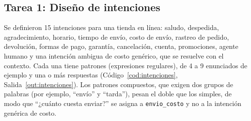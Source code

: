 \documentclass[11pt,letterpaper]{article}
\begin{document}
\subsection{Tarea 1: Diseño de intenciones}

Se definieron 15 intenciones para una tienda en línea: saludo, despedida, agradecimiento, horario, tiempo de envío, costo de envío, rastreo de pedido, devolución, formas de pago, garantía, cancelación, cuenta, promociones, agente humano y una intención ambigua de costo genérico, que se resuelve con el contexto. Cada una tiene patrones (expresiones regulares), de 4 a 9 enunciados de ejemplo y una o más respuestas (Código~\ref{cod:intenciones}, Salida~\ref{out:intenciones}). Los patrones compuestos, que exigen dos grupos de palabras (por ejemplo, ``envío'' y ``tarda''), pesan el doble que los simples, de modo que ``¿cuánto cuesta enviar?'' se asigna a \texttt{envio\_costo} y no a la intención genérica de costo.
\end{document}
